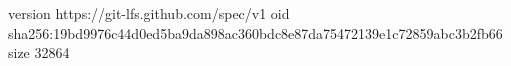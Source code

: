 version https://git-lfs.github.com/spec/v1
oid sha256:19bd9976c44d0ed5ba9da898ac360bdc8e87da75472139e1c72859abc3b2fb66
size 32864
